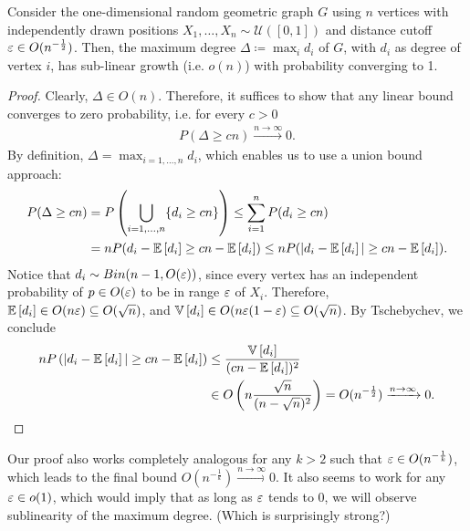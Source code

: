 \begin{aufgabe}
    Consider the one-dimensional random geometric graph $G$ using $n$ vertices with independently drawn positions $X_1, \dots, X_n  \sim \mathcal U([0,1])$
    and distance cutoff $\varepsilon \in O(n^{-\frac{1}{2}})$. Then, the maximum degree $\Delta \coloneqq \max_{i} d_i$ of $G$, with $d_i$ as degree of vertex $i$, has sub-linear growth (i.e. $o(n)$) with probability converging to 1.
    \begin{proof}
        Clearly, $\Delta \in O(n)$. Therefore, it suffices to show that any linear bound converges to zero probability, i.e. for every $c > 0$
        \begin{align*}
            P(\Delta \geq cn) \xrightarrow{n \rightarrow \infty} 0.
        \end{align*}
        By definition, $\Delta = \max_{i=1,\dots,n} d_i$, which enables us to use a union bound approach:
        \begin{align*}
            P(\Delta \geq cn) & = P\left(\bigcup_{i=1,\dots,n}\{d_i \geq  cn \} \right) \leq \sum_{i=1}^n P(d_i \geq cn)                \\
                              & = n P(d_i - \mathbb{E}\left[d_i\right] \geq cn - \mathbb{E}\left[d_i\right]) \leq n P(|d_i - \mathbb{E}\left[d_i\right]| \geq cn - \mathbb{E}\left[d_i\right]).
        \end{align*}
        Notice that $d_i \sim Bin(n-1,O(\varepsilon))$, since every vertex has an independent probability of $p \in O(\varepsilon)$ to be in range $\varepsilon$ of $X_i$.
        Therefore, $\mathbb{E}\left[d_i\right] \in O(n \varepsilon) \subseteq O(\sqrt{n})$, and $\mathbb{V}\left[d_i\right] \in O(n \varepsilon (1-\varepsilon) \subseteq O(\sqrt{n})$.
        By Tschebychev, we conclude
        \begin{align*}
            n P\left(|d_i - \mathbb{E}\left[d_i\right]| \geq cn - \mathbb{E}\left[d_i\right]\right) & \leq \frac{\mathbb{V}\left[d_i\right]}{(cn - \mathbb{E}\left[d_i\right])^2}                                                                 \\
                                                                        & \in O \left( n\frac{\sqrt{n}}{(n-\sqrt{n})^2} \right) = O(n^{-\frac{1}{2}}) \xrightarrow{n \rightarrow \infty} 0.
        \end{align*}
    \end{proof}
    Our proof also works completely analogous for any $k > 2$ such that $\varepsilon \in O(n^{-\frac{1}{k}})$, which leads to the final bound $O(n^{-\frac{1}{k}}) \xrightarrow{n \rightarrow \infty} 0$.
    It also seems to work for any $\varepsilon \in o(1)$, which would imply that as long as $\varepsilon$ tends to $0$, we will observe sublinearity of the maximum degree. (Which is surprisingly strong?)
\end{aufgabe}
